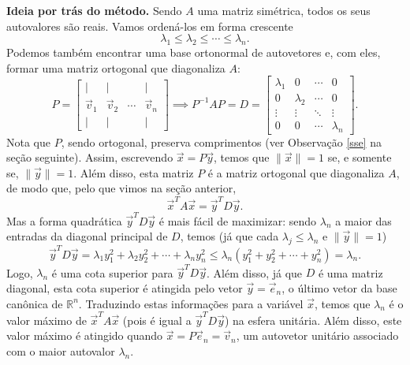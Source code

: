 \noindent \textbf{Ideia por trás do método.} Sendo $A$ uma matriz simétrica, todos os seus autovalores são reais. Vamos ordená-los em forma crescente
\begin{equation}
\lambda_1 \le \lambda_2 \le \cdots \le \lambda_n.
\end{equation} Podemos também encontrar uma base ortonormal de autovetores e, com eles, formar uma matriz ortogonal que diagonaliza $A$:
\begin{equation}
P =
\begin{bmatrix}
| & | &  & | \\
\vec{v}_1 & \vec{v}_2 & \cdots & \vec{v}_n \\
| & | &  & |
\end{bmatrix} \implies
P^{-1} A P = D =
\begin{bmatrix}
\lambda_1 & 0  & \cdots & 0 \\
0 & \lambda_2  & \cdots & 0 \\
\vdots & \vdots & \ddots & \vdots \\
0 & 0 & \cdots & \lambda_n
\end{bmatrix}.
\end{equation} Nota que $P$, sendo ortogonal, preserva comprimentos (ver Observação \ref{sse} na seção seguinte). Assim, escrevendo $\vec{x} = P \vec{y}$, temos que $\|\vec{x}\| = 1$ se, e somente se, $\|\vec{y}\| = 1$. Além disso, esta matriz $P$ é a matriz ortogonal que diagonaliza $A$, de modo que, pelo que vimos na seção anterior,
\begin{equation}
\vec{x}^T A \vec{x} = \vec{y}^T D \vec{y}.
\end{equation} Mas a forma quadrática $\vec{y}^T D \vec{y}$ é mais fácil de maximizar: sendo $\lambda_n$ a maior das entradas da diagonal principal de $D$, temos (já que cada $\lambda_j \le \lambda_n$ e $\|\vec{y}\| = 1$)
\begin{equation}
\vec{y}^T D \vec{y} = \lambda_1 y_1^2 + \lambda_2 y_2^2 + \cdots + \lambda_n y_n^2 \le  \lambda_n (y_1^2 +y_2^2 + \cdots + y_n^2) = \lambda_n.
\end{equation} Logo, $\lambda_n$ é uma cota superior para $\vec{y}^T D \vec{y}$. Além disso, já que $D$ é uma matriz diagonal, esta cota superior é atingida pelo vetor $\vec{y} = \vec{e}_n$, o último vetor da base canônica de $\mathbb{R}^n$. Traduzindo estas informações para a variável $\vec{x}$, temos que $\lambda_n$ é o valor máximo de $\vec{x}^T A \vec{x}$ (pois é igual a $\vec{y}^T D \vec{y}$) na esfera unitária. Além disso, este valor máximo é atingido quando $\vec{x} = P \vec{e}_n = \vec{v}_n$, um autovetor unitário associado com o maior autovalor $\lambda_n$.

